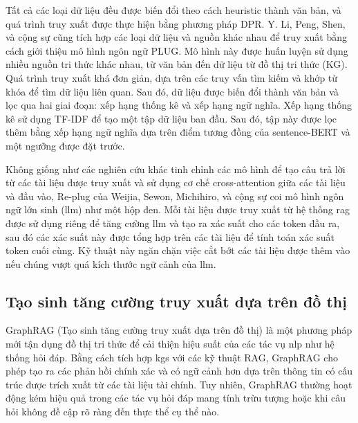 Tất cả các loại dữ liệu đều được biến đổi theo cách heuristic thành văn bản, và quá trình truy xuất được thực hiện bằng phương pháp DPR. Y. Li, Peng, Shen, và cộng sự \cite{li2021knowledge} cũng tích hợp các loại dữ liệu và nguồn khác nhau để truy xuất bằng cách giới thiệu mô hình ngôn ngữ PLUG. Mô hình này được huấn luyện sử dụng nhiều nguồn tri thức khác nhau, từ văn bản đến dữ liệu từ đồ thị tri thức (KG). Quá trình truy xuất khá đơn giản, dựa trên các truy vấn tìm kiếm và khớp từ khóa để tìm dữ liệu liên quan. Sau đó, dữ liệu được biến đổi thành văn bản và lọc qua hai giai đoạn: xếp hạng thống kê và xếp hạng ngữ nghĩa. Xếp hạng thống kê sử dụng TF-IDF để tạo một tập dữ liệu ban đầu. Sau đó, tập này được lọc thêm bằng xếp hạng ngữ nghĩa dựa trên điểm tương đồng của sentence-BERT và một ngưỡng được đặt trước.


Không giống như các nghiên cứu khác tinh chỉnh các mô hình để tạo câu trả lời từ các tài liệu được truy xuất và sử dụng cơ chế cross-attention giữa các tài liệu và đầu vào, Re-plug của Weijia, Sewon, Michihiro, và cộng sự \cite{weijia2023replug} coi mô hình ngôn ngữ lớn sinh (\gls{llm}) như một hộp đen. Mỗi tài liệu được truy xuất từ hệ thống \gls{rag} được sử dụng riêng để tăng cường \gls{llm} và tạo ra xác suất cho các token đầu ra, sau đó các xác suất này được tổng hợp trên các tài liệu để tính toán xác suất token cuối cùng. Kỹ thuật này ngăn chặn việc cắt bớt các tài liệu được thêm vào nếu chúng vượt quá kích thước ngữ cảnh của \gls{llm}.


\subsection{Tạo sinh tăng cường truy xuất dựa trên đồ thị}
\label{subsection:graph_based_rag}


GraphRAG (Tạo sinh tăng cường truy xuất dựa trên đồ thị) \cite{cao2007learning,nogueira2019passage,guu2020realm,izacard2020leveraging,borgeaud2022improving,oguz2020unikqa} là một phương pháp mới tận dụng đồ thị tri thức để cải thiện hiệu suất của các tác vụ \gls{nlp} như hệ thống hỏi đáp. Bằng cách tích hợp \gls{kg}s với các kỹ thuật RAG, GraphRAG cho phép tạo ra các phản hồi chính xác và có ngữ cảnh hơn dựa trên thông tin có cấu trúc được trích xuất từ các tài liệu tài chính. Tuy nhiên, GraphRAG thường hoạt động kém hiệu quả trong các tác vụ hỏi đáp mang tính trừu tượng hoặc khi câu hỏi không đề cập rõ ràng đến thực thể cụ thể nào.


